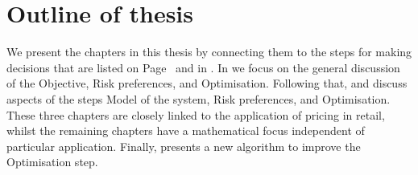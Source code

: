 \documentclass[main.tex]{subfiles}
\begin{document}


\section{Outline of thesis}
We present the chapters in this thesis by connecting them to the
steps for making decisions that are listed
on Page~\pageref{enum:making_decisions} and in .
In  we focus on the general discussion of the
Objective, Risk preferences, and Optimisation.
Following that,  and
 discuss  aspects of the steps Model of the system, Risk
preferences, and Optimisation.
These three chapters are closely linked to the application of pricing
in retail, whilst the remaining chapters have a mathematical focus
independent of particular application.
Finally,  presents a new
algorithm to improve the Optimisation step.

\biblio{} %
\end{document}
